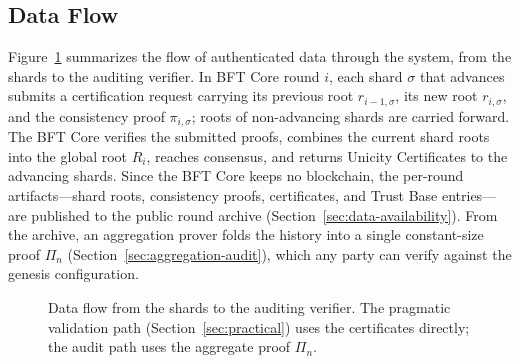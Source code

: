 \documentclass[twocolumn]{article}
\begin{document}
\subsection{Data Flow}
\label{sec:data-flow}

Figure~\ref{fig:dataflow} summarizes the flow of authenticated data through the system, from the shards to the auditing verifier. In BFT Core round $i$, each shard $\sigma$ that advances submits a certification request carrying its previous root $r_{i-1,\sigma}$, its new root $r_{i,\sigma}$, and the consistency proof $\pi_{i,\sigma}$; roots of non-advancing shards are carried forward. The BFT Core verifies the submitted proofs, combines the current shard roots into the global root $R_i$, reaches consensus, and returns Unicity Certificates to the advancing shards. Since the BFT Core keeps no blockchain, the per-round artifacts---shard roots, consistency proofs, certificates, and Trust Base entries---are published to the public round archive (Section~\ref{sec:data-availability}). From the archive, an aggregation prover folds the history into a single constant-size proof $\Pi_n$ (Section~\ref{sec:aggregation-audit}), which any party can verify against the genesis configuration.

\begin{figure}[!htbp]
    \centering
{}
    \caption{Data flow from the shards to the auditing verifier. The pragmatic validation path (Section~\ref{sec:practical}) uses the certificates directly; the audit path uses the aggregate proof $\Pi_n$.}\label{fig:dataflow}
\end{figure}
\end{document}
